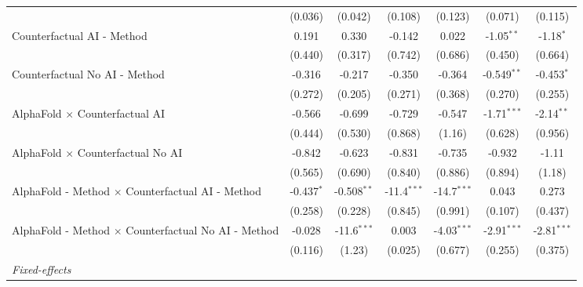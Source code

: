 \begin{tabular}{lcccccc}
                                                              & (0.036)      & (0.042)       & (0.108)       & (0.123)       & (0.071)       & (0.115)\\   
   Counterfactual AI - Method                                 & 0.191        & 0.330         & -0.142        & 0.022         & -1.05$^{**}$  & -1.18$^{*}$\\   
                                                              & (0.440)      & (0.317)       & (0.742)       & (0.686)       & (0.450)       & (0.664)\\   
   Counterfactual No AI - Method                              & -0.316       & -0.217        & -0.350        & -0.364        & -0.549$^{**}$ & -0.453$^{*}$\\   
                                                              & (0.272)      & (0.205)       & (0.271)       & (0.368)       & (0.270)       & (0.255)\\   
   AlphaFold $\times$ Counterfactual AI                       & -0.566       & -0.699        & -0.729        & -0.547        & -1.71$^{***}$ & -2.14$^{**}$\\   
                                                              & (0.444)      & (0.530)       & (0.868)       & (1.16)        & (0.628)       & (0.956)\\   
   AlphaFold $\times$ Counterfactual No AI                    & -0.842       & -0.623        & -0.831        & -0.735        & -0.932        & -1.11\\   
                                                              & (0.565)      & (0.690)       & (0.840)       & (0.886)       & (0.894)       & (1.18)\\   
   AlphaFold - Method $\times$ Counterfactual AI - Method     & -0.437$^{*}$ & -0.508$^{**}$ & -11.4$^{***}$ & -14.7$^{***}$ & 0.043         & 0.273\\   
                                                              & (0.258)      & (0.228)       & (0.845)       & (0.991)       & (0.107)       & (0.437)\\   
   AlphaFold - Method $\times$ Counterfactual No AI - Method  & -0.028       & -11.6$^{***}$ & 0.003         & -4.03$^{***}$ & -2.91$^{***}$ & -2.81$^{***}$\\   
                                                              & (0.116)      & (1.23)        & (0.025)       & (0.677)       & (0.255)       & (0.375)\\   
   \midrule
   \emph{Fixed-effects}\\

\end{tabular}
